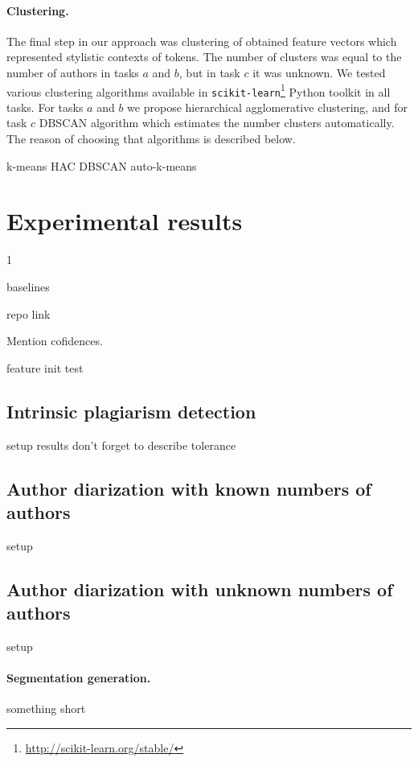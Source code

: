 \documentclass[10pt, a4paper]{article}
\begin{document}
\paragraph{Clustering.}

The final step in our approach was clustering of obtained feature vectors which represented stylistic contexts of tokens. The number of clusters was equal to the number of authors in tasks $a$ and $b$, but in task $c$ it was unknown. We tested various clustering algorithms available in \texttt{scikit-learn}\footnote{\url{http://scikit-learn.org/stable/}} Python toolkit in all tasks. For tasks $a$ and $b$ we propose hierarchical agglomerative clustering, and for task $c$ DBSCAN algorithm which estimates the number clusters automatically. The reason of choosing that algorithms is described below. 

k-means HAC DBSCAN auto-k-means

\section{Experimental results}

1

baselines

repo link

Mention cofidences.

feature init test

\subsection{Intrinsic plagiarism detection}

setup
results
don't forget to describe tolerance

\subsection{Author diarization with known numbers of authors}

setup

\subsection{Author diarization with unknown numbers of authors}

setup

\paragraph{Segmentation generation.} something short
\end{document}
